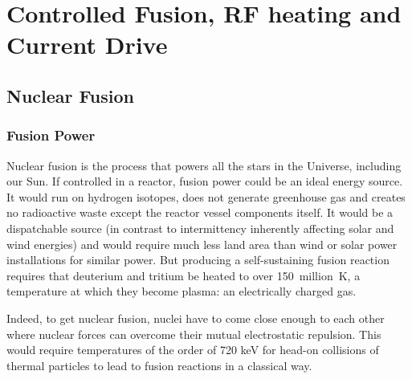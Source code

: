 \setchapterpreamble[u]{\margintoc}
\chapter{Controlled Fusion, RF heating and Current Drive}
\label{chap:fusion_and_rf}


\section{Nuclear Fusion}
\subsection{Fusion Power}

Nuclear fusion is the process that powers all the stars in the Universe, including our Sun. If controlled in a reactor, fusion power could be an ideal energy source. It would run on hydrogen isotopes, does not generate greenhouse gas and creates no radioactive waste except the reactor vessel components itself. It would be a dispatchable source (in contrast to intermittency inherently affecting solar and wind energies) and would require much less land area than wind or solar power installations for similar power. But producing a self-sustaining fusion reaction requires that deuterium and tritium be heated to over 150~million~\si{K}, a temperature at which they become plasma: an electrically charged gas. 

Indeed, to get nuclear fusion, nuclei have to come close enough to each other where nuclear forces can overcome their mutual electrostatic repulsion. This would require temperatures of the order of 720 \si{keV} for head-on collisions of thermal particles to lead to fusion reactions in a classical way. 

